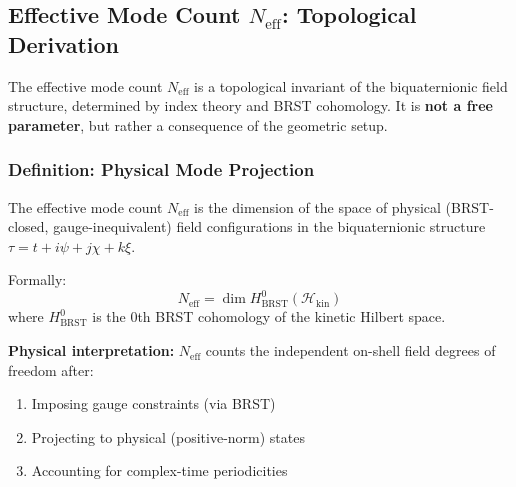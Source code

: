 

\subsection{Effective Mode Count \texorpdfstring{\(N_{\mathrm{eff}}\)}{N\_eff}: Topological Derivation}
\label{sec:Neff-proof}

The effective mode count \(N_{\mathrm{eff}}\) is a topological invariant of the
biquaternionic field structure, determined by index theory and BRST cohomology.
It is \textbf{not a free parameter}, but rather a consequence of the geometric setup.

\subsubsection{Definition: Physical Mode Projection}

\begin{definition}
\label{def:Neff}
The effective mode count \(N_{\mathrm{eff}}\) is the dimension of the space of
physical (BRST-closed, gauge-inequivalent) field configurations in the
biquaternionic structure \(\tau = t + i\psi + j\chi + k\xi\).

Formally:
\begin{equation}
\label{eq:Neff-definition}
N_{\mathrm{eff}} = \dim H^0_{\text{BRST}}(\mathcal{H}_{\text{kin}})
\end{equation}
where \(H^0_{\text{BRST}}\) is the 0th BRST cohomology of the kinetic Hilbert space.
\end{definition}

\textbf{Physical interpretation:} \(N_{\mathrm{eff}}\) counts the independent
on-shell field degrees of freedom after:
\begin{enumerate}
    \item Imposing gauge constraints (via BRST)
    \item Projecting to physical (positive-norm) states
    \item Accounting for complex-time periodicities
\end{enumerate}

